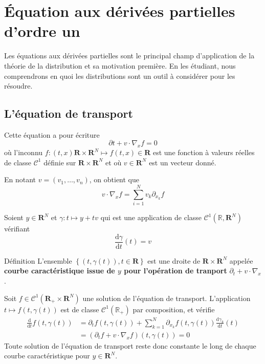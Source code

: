 \newpage

\section{Équation aux dérivées partielles d’ordre un}

    Les équations aux dérivées partielles sont le principal champ d’application de la théorie de la distribution et sa motivation première. En les étudiant, nous comprendrons en quoi les distributions sont un outil à considérer pour les résoudre.

    \subsection{L’équation de transport}

        Cette équation a pour écriture 
        \[ \partial t + v \cdot \nabla_x f = 0 \]   
        où l’inconnu $f: (t,x) \mathbf{R} \times \mathbf{R}^N \mapsto f(t,x) \in \mathbf{R}$ est une fonction à valeurs réelles de classe $\mathcal{C}^1$ définie sur $\mathbf{R} \times \mathbf{R}^N$ et où $v \in \mathbf{R}^N$ est un vecteur donné.

        En notant $v = (v_1,\ldots, v_n)$, on obtient que 
        \[ v \cdot \nabla_x f = \sum_{i=1}^N v_k \partial_{x_k} f \]   

        Soient $y \in \mathbf{R}^N$ et $\gamma : t \mapsto y + tv$ qui est une application de classe $\mathcal{C}^1(\mathbb{R}, \mathbf{R}^N)$ vérifiant 
        \[ \frac{\text{d}\gamma}{\text{d}t} (t) = v \]   

        \begin{omed}{Définition}
            L’ensemble $\left\{(t, \gamma(t)), t \in \mathbf{R}\right\}$ est une droite de $\mathbf{R} \times \mathbf{R}^N$ appelée \textbf{courbe caractéristique issue de $y$ pour l’opération de tranport} $\partial_t + v \cdot \nabla_x$.
        \end{omed}

        Soit $f \in \mathcal{C}^1(\mathbf{R}_+ \times \mathbf{R}^N)$ une solution de l’équation de transport. L’application $t \mapsto f(t, \gamma(t))$ est de classe $\mathcal{C}^1(\mathbb{R}_+)$ par composition, et vérifie 
        \begin{align*}
            \frac{\text{d}}{\text{d}t} f(t,\gamma(t))
            &= \partial_t f(t, \gamma(t)) + \sum_{k=1}^N \partial_{x_k}f(t,\gamma(t))\frac{\text{d}\gamma_k}{\text{d}t} (t) \\
            &= (\partial_t f + v \cdot \nabla_x f)(t, \gamma(t)) = 0
        \end{align*}
        Toute solution de l’équation de transport reste donc constante le long de chaque courbe caractéristique pour $y \in \mathbf{R}^N$.


